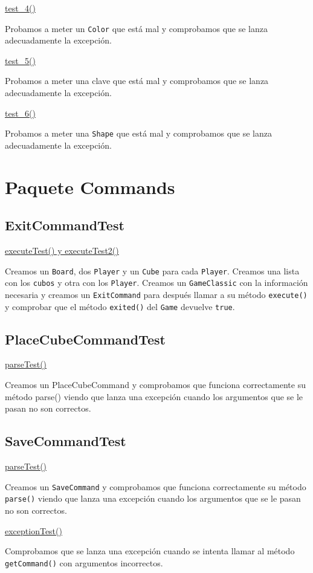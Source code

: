 \documentclass[../DocumentoOficial.tex]{subfiles}
\begin{document}
\underline{test\_4()}

Probamos a meter un \texttt{Color} que está mal y comprobamos que se lanza adecuadamente la excepción.

\underline{test\_5()}

Probamos a meter una clave que está mal y comprobamos que se lanza adecuadamente la excepción.

\underline{test\_6()}

Probamos a meter una \texttt{Shape} que está mal y comprobamos que se lanza adecuadamente la excepción.


\section{Paquete Commands}
\subsection{ExitCommandTest}
\underline{executeTest() y executeTest2()}

Creamos un \texttt{Board}, dos \texttt{Player} y un \texttt{Cube} para cada \texttt{Player}. Creamos una lista con los \texttt{cubos} y otra con los \texttt{Player}. Creamos un \texttt{GameClassic} con la información necesaria y creamos un \texttt{ExitCommand} para después llamar a su método \texttt{execute()} y comprobar que el método \texttt{exited()} del \texttt{Game} devuelve \texttt{true}.

\subsection{PlaceCubeCommandTest}
\underline{parseTest()}

Creamos un PlaceCubeCommand y comprobamos que funciona correctamente su método parse() viendo que lanza una excepción cuando los argumentos que se le pasan no son correctos.

\subsection{SaveCommandTest}
\underline{parseTest()}

Creamos un \texttt{SaveCommand} y comprobamos que funciona correctamente su método \texttt{parse()} viendo que lanza una excepción cuando los argumentos que se le pasan no son correctos.

\underline{exceptionTest()}

Comprobamos que se lanza una excepción cuando se intenta llamar al método \texttt{getCommand()} con argumentos incorrectos.
\end{document}
